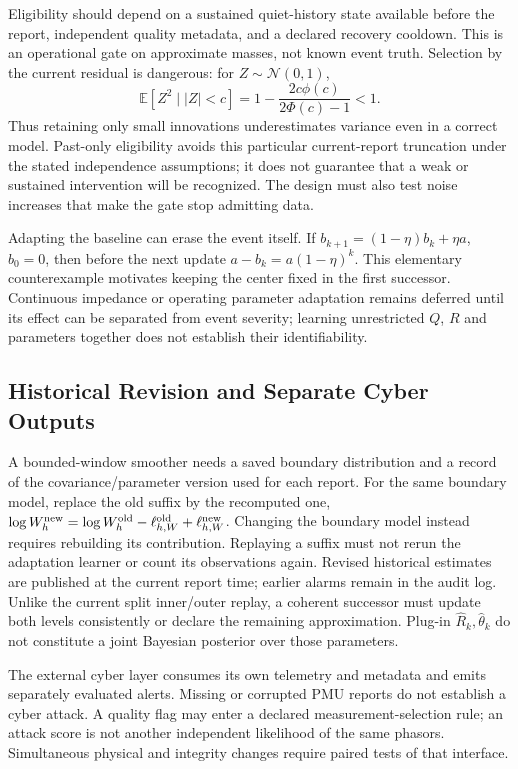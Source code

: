 Eligibility should depend on a sustained quiet-history state available
before the report, independent quality metadata, and a declared recovery
cooldown. This is an operational gate on approximate masses, not known
event truth. Selection by the current residual is dangerous: for
$Z\sim\mathcal N(0,1)$,
\begin{equation}
 \mathbb E[Z^2\mid |Z|<c]
 =1-\frac{2c\phi(c)}{2\Phi(c)-1}<1.
 \label{eq:adaptive-selection-bias}
\end{equation}
Thus retaining only small innovations underestimates variance even in
a correct model. Past-only eligibility avoids this particular current-report
truncation under the stated independence assumptions; it does not guarantee
that a weak or sustained intervention will be recognized. The design must
also test noise increases that make the gate stop admitting data.

Adapting the baseline can erase the event itself. If
$b_{k+1}=(1-\eta)b_k+\eta a$, $b_0=0$, then before the next update
$a-b_k=a(1-\eta)^k$. This elementary counterexample motivates keeping
the center fixed in the first successor. Continuous impedance or operating
parameter adaptation remains deferred until its effect can be separated
from event severity; learning unrestricted $Q$, $R$ and parameters together
does not establish their identifiability.

\subsection{Historical Revision and Separate Cyber Outputs}
A bounded-window smoother needs a saved boundary distribution and a
record of the covariance/parameter version used for each report.
For the same boundary model, replace the old suffix by the recomputed
one, $\log W_h^{\rm new}=\log W_h^{\rm old}
-\ell_{h,W}^{\rm old}+\ell_{h,W}^{\rm new}$.
Changing the boundary model instead requires rebuilding its contribution.
Replaying a suffix must not rerun the adaptation learner or count its
observations again. Revised historical estimates are published at the
current report time; earlier alarms remain in the audit log.
Unlike the current split inner/outer replay, a coherent successor must
update both levels consistently or declare the remaining approximation.
Plug-in $\widehat R_k,\widehat\theta_k$ do not constitute a joint Bayesian
posterior over those parameters.

The external cyber layer consumes its own telemetry and metadata and
emits separately evaluated alerts. Missing or corrupted PMU reports do
not establish a cyber attack. A quality flag may enter a declared
measurement-selection rule; an attack score is not another independent
likelihood of the same phasors. Simultaneous physical and integrity
changes require paired tests of that interface.

